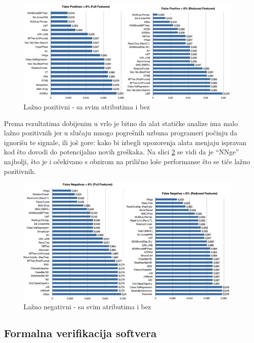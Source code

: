 \documentclass[a4paper]{article}
\begin{document}
\begin{figure}[h!]
\centering
\includegraphics[width=\textwidth]{false_positive.png}
\caption{Lažno pozitivni - sa svim atributima i bez}
\label{fig:falsePos}
\end{figure}

Prema rezultatima dobijenim u  \cite{baca} vrlo je bitno da alat statičke analize ima malo lažno pozitivnih jer
u slučaju mnogo pogrešnih uzbuna programeri počinju da ignorišu te signale, ili još gore: kako bi izbegli upozorenja alata menjaju ispravan kod što dovodi do potencijalno
 novih greškaka. Na slici \ref{fig:falseNeg} se vidi da je ``NNge'' najbolji, što je i očekivano s obzirom na prilično
loše performanse što se tiče lažno pozitivnih.

\begin{figure}[h!]
\centering
\includegraphics[width=\textwidth]{false_negative.png}
\caption{Lažno negativni - sa svim atributima i bez}
\label{fig:falseNeg}
\end{figure}

\subsection{Formalna verifikacija softvera}
\end{document}
